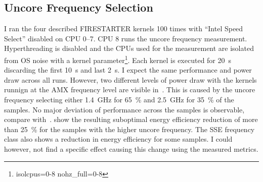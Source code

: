 \subsection{Uncore Frequency Selection}
\label{sec:avx-anomalies-uncore-freqency}

I ran the four described FIRESTARTER kernels \SI{100}{} times with ``Intel Speed Select'' disabled on CPU 0--7.
CPU 8 runs the uncore frequency measurement.
Hyperthreading is disabled and the CPUs used for the measurement are isolated from OS noise with a kernel parameter\footnote{isolcpus=0-8 nohz\_full=0-8}.
Each kernel is executed for \SI{20}{\s} discarding the first \SI{10}{\s} and last \SI{2}{\s}.
I expect the same performance and power draw across all runs.
However, two different levels of power draw with the kernels runnign at the AMX frequency level are visible in~.
This is caused by the uncore frequency selecting either \SI{1.4}{\GHz} for \SI{65}{\percent} and \SI{2.5}{\GHz} for \SI{35}{\percent} of the samples.
No major deviation of performance across the samples is observable, compare with~.
 show the resulting suboptimal energy efficiency reduction of more than \SI{25}{\percent} for the samples with the higher uncore frequency.
The SSE frequency class also shows a reduction in energy efficiency for some samples.
I could however, not find a specific effect causing this change using the measured metrics.

